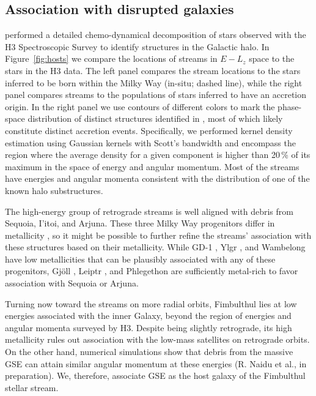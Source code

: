 \documentclass[twocolumn]{aastex63}
\newcommand{\feh}{\ensuremath{\textrm{[Fe/H]}}}
\begin{document}
\subsection{Association with disrupted galaxies}
\label{sec:hosts}

\citet{naidu2020} performed a detailed chemo-dynamical decomposition of stars observed with the H3 Spectroscopic Survey to identify structures in the Galactic halo.
In Figure~\ref{fig:hosts} we compare the locations of streams in $E-L_z$ space to the stars in the H3 data.
The left panel compares the stream locations to the stars inferred to be born within the Milky Way (in-situ; dashed line), while the right panel compares streams to the populations of stars inferred to have an accretion origin.
In the right panel we use contours of different colors to mark the phase-space distribution of distinct structures identified in \citet{naidu2020}, most of which likely constitute distinct accretion events.
Specifically, we performed kernel density estimation using Gaussian kernels with Scott's bandwidth and encompass the region where the average density for a given component is higher than 20\,\% of its maximum in the space of energy and angular momentum.
Most of the streams have energies and angular momenta consistent with the distribution of one of the known halo substructures.

The high-energy group of retrograde streams is well aligned with debris from Sequoia, I'itoi, and Arjuna.
These three Milky Way progenitors differ in metallicity \citep{naidu2020}, so it might be possible to further refine the streams' association with these structures based on their metallicity.
While GD-1 \citep[spectroscopic $\feh=-2.3$,][]{bonaca2020b}, Ylgr \citep[spectroscopic $\feh=-1.9$,][]{ibata2019}, and  Wambelong \citep[isochrone $\feh=-2.2$,][]{shipp2018} have low metallicities that can be plausibly associated with any of these progenitors, Gj\" oll \citep[spectroscopic $\feh=-1.5$,][]{hansen2020}, Leiptr \citep[isochrone $\feh=-1.6$,][]{ibata2019}, and Phlegethon \citep[spectroscopic $\feh=-1.6$,][]{ibata2018} are sufficiently metal-rich to favor association with Sequoia or Arjuna.

Turning now toward the streams on more radial orbits, Fimbulthul lies at low energies associated with the inner Galaxy, beyond the region of energies and angular momenta surveyed by H3.
Despite being slightly retrograde, its high metallicity rules out association with the low-mass satellites on retrograde orbits.
On the other hand, numerical simulations show that debris from the massive GSE can attain similar angular momentum at these energies (R. Naidu et al., in preparation).
We, therefore, associate GSE as the host galaxy of the Fimbulthul stellar stream.
\end{document}
